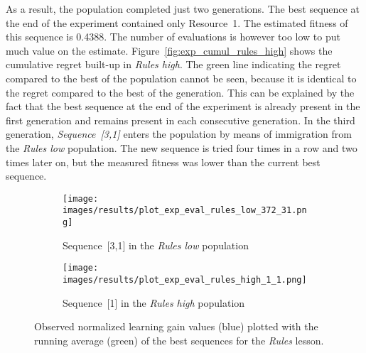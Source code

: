 As a result, the population completed just two generations. The best sequence at the
end of the experiment contained only Resource~1. The estimated fitness of this
sequence is 0.4388. The number of evaluations is however too low to put much
value on the estimate. Figure~\ref{fig:exp_cumul_rules_high} shows the
cumulative regret built-up in \emph{Rules high}. The green line indicating the
regret compared to the best of the population cannot be seen, because it is
identical to the regret compared to the best of the generation. This can be
explained by the fact that the best sequence at the end of the experiment is
already present in the first generation and remains present in each consecutive
generation. In the third generation, \emph{Sequence~[3,1]} enters the population
by means of immigration from the \emph{Rules low} population. The new sequence
is tried four times in a row and two times later on, but the measured fitness
was lower than the current best sequence.

\begin{figure}[ht]
	\begin{subfigure}{0.9\linewidth}
	\centering
	\texttt{[image: images/results/plot\_exp\_eval\_rules\_low\_372\_31.png]}
	\caption{Sequence~[3,1] in the \emph{Rules low} population}
	\label{fig:exp_eval_rules_low_372}
	\end{subfigure}
	\hfill
	\begin{subfigure}{0.9\linewidth}
	\centering
	\texttt{[image: images/results/plot\_exp\_eval\_rules\_high\_1\_1.png]}
	\caption{Sequence~[1] in the \emph{Rules high} population}
	\label{fig:exp_eval_rules_high_1}
	\end{subfigure}
	\caption{Observed normalized learning gain values (blue) plotted with the
		running average (green) of the best sequences for the \emph{Rules}
	lesson.}
	\label{fig:exp_eval_rules}
\end{figure}

